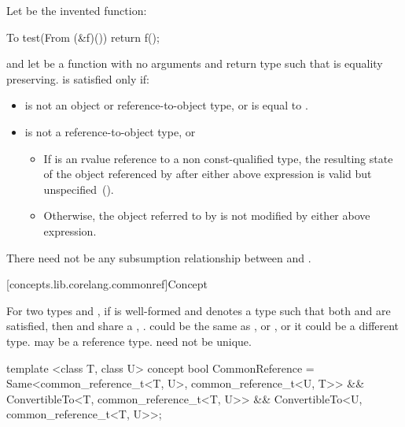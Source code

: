 \begin{itemdescr}
\pnum
Let  be the invented function:
\begin{codeblock}
To test(From (&f)()) {
  return f();
}
\end{codeblock}
and let  be a function with no arguments and return type 
such that  is equality preserving.
 is satisfied only if:

\begin{itemize}
\item
{} is not an object or reference-to-object type, or
 is equal to .

\item
{} is not a reference-to-object type, or

\begin{itemize}
\item
If  is an rvalue reference to a non const-qualified type, the resulting state of the object referenced by  after either above expression is valid but unspecified~().

\item
Otherwise, the object referred to by  is not modified by either above expression.
\end{itemize}

\end{itemize}

\pnum
There need not be any subsumption relationship between 
and .
\end{itemdescr}


[concepts.lib.corelang.commonref]{Concept }

\pnum
For two types  and , if 
is well-formed and denotes a type  such that both
 and  are
satisfied, then  and  share a , . \enternote {} could be the same as , or
, or it could be a different type.  may be a reference
type.  need not be unique.\exitnote

%
\begin{itemdecl}
template <class T, class U>
concept bool CommonReference =
  Same<common_reference_t<T, U>, common_reference_t<U, T>> &&
  ConvertibleTo<T, common_reference_t<T, U>> &&
  ConvertibleTo<U, common_reference_t<T, U>>;
\end{itemdecl}

